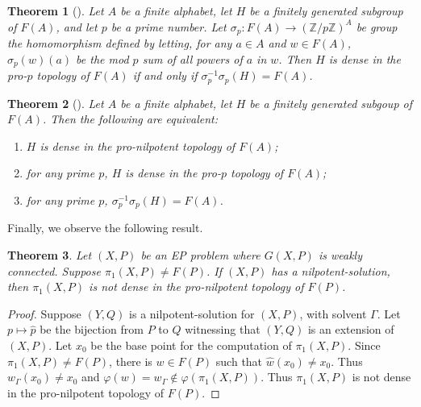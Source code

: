 \documentclass[10pt,a4paper]{amsart}
\newtheorem{theorem}{Theorem}[section]
\newtheorem{lemma}[theorem]{Lemma}
\theoremstyle{definition}
\theoremstyle{definition}
\numberwithin{equation}{section}
\begin{document}

\begin{theorem}[{\cite[Corollary 3.5]{MSW01}}]\label{thm:MSW} Let $A$ be a finite alphabet, let $H$ be a finitely generated subgroup of $F(A)$, and let $p$ be a prime number. Let $\sigma_p\colon F(A)\to (\mathbb{Z}/p\mathbb{Z})^A$ be group the homomorphism defined by letting, for any $a\in A$ and $w\in F(A)$, $\sigma_p(w)(a)$ be the mod $p$ sum of all powers of $a$ in $w$. Then $H$ is dense in the pro-$p$ topology of $F(A)$ if and only if $\sigma_p^{-1}\sigma_p(H)=F(A)$.
\end{theorem}

\begin{theorem}[{\cite[Corollary 4.2]{MSW01}}] \label{thm:MSW2} Let $A$ be a finite alphabet, let $H$ be a finitely generated subgoup of $F(A)$. Then the following are equivalent:
\begin{enumerate}
\item[\rm (i)] $H$ is dense in the pro-nilpotent topology of $F(A)$;
\item[\rm (ii)] for any prime $p$, $H$ is dense in the pro-$p$ topology of $F(A)$;
\item[\rm (iii)] for any prime $p$, $\sigma_p^{-1}\sigma_p(H)=F(A)$.
\end{enumerate}
\end{theorem}

Finally, we observe the following result.

\begin{theorem}\label{thm:nonil} Let $(X,P)$ be an EP problem where $G(X, P)$ is weakly connected. Suppose $\pi_1(X, P)\neq F(P)$. If $(X, P)$ has a nilpotent-solution, then $\pi_1(X, P)$ is not dense in the pro-nilpotent topology of $F(P)$.
\end{theorem}

\begin{proof} Suppose $(Y, Q)$ is a nilpotent-solution for $(X, P)$, with solvent $\Gamma$. Let $p\mapsto \hat{p}$ be the bijection from $P$ to $Q$ witnessing that $(Y, Q)$ is an extension of $(X, P)$. Let $x_0$ be the base point for the computation of $\pi_1(X, P)$. Since $\pi_1(X, P)\neq F(P)$, there is $w\in F(P)$ such that $\hat{w}(x_0)\neq x_0$. Thus $w_\Gamma(x_0)\neq x_0$ and $\varphi(w)=w_\Gamma\not\in \varphi(\pi_1(X, P))$. Thus $\pi_1(X, P)$ is not dense in the pro-nilpotent topology of $F(P)$.
\end{proof}
\end{document}
